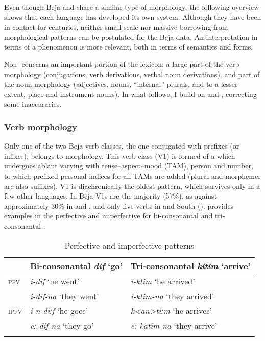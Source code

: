 \documentclass[output=paper]{langsci/langscibook}
\begin{document}
Even though Beja and  share a similar type of morphology, the following overview shows that each language has developed its own system. Although they have been in contact for centuries, neither small-scale nor massive borrowing from  morphological patterns can be postulated for the Beja data. An interpretation in terms of a  phenomenon is more relevant, both in terms of semantics and forms.

Non- concerns an important portion of the lexicon: a large part of the verb morphology (conjugations, verb derivations, verbal noun derivations), and part of the noun morphology (adjectives, nouns, “internal” plurals, and to a lesser extent, place and instrument nouns). In what follows, I build on \citet{Vanhove2012} and \citet{Vanhove2017}, correcting some inaccuracies.


 \subsubsection{Verb morphology}

Only one of the two Beja verb classes, the one conjugated with prefixes (or infixes), belongs to  morphology. This verb class (V1) is formed of a  which undergoes ablaut varying with tense--aspect--mood (TAM), person and number, to which prefixed personal indices for all TAMs are added (plural and  morphemes are also suffixes). V1 is diachronically the oldest pattern, which survives only in a few other  languages. In Beja V1s are the majority (57\%), as against approximately 30\% in  and , and only five verbs in  and South  (\citealt[256]{Cohen1988}).  provides examples in the perfective and imperfective for bi-consonantal and tri-consonantal . 

\begin{table}
\begin{tabular}{lll}
\lsptoprule
& Bi-consonantal \textit{dif} ‘go’ & Tri-consonantal \textit{kitim} ‘arrive’\\\midrule
\textsc{pfv} & \textit{i-dif} ‘he went’  & \textit{i-ktim} ‘he arrived’\\
{} & \textit{i-dif-na} ‘they went’ & \textit{i-ktim-na} ‘they arrived’\\
\textsc{ipfv} & \textit{i-n-diːf} ‘he goes’ & \textit{k<an>tiːm} ‘he arrives’\\
{} &\textit{eː-dif-na} ‘they go’ & \textit{eː-katim-na} ‘they arrive’\\
\lspbottomrule
\end{tabular} 
\caption{Perfective and imperfective patterns}
\label{tab:vanhove:2}
\end{table}
\end{document}
